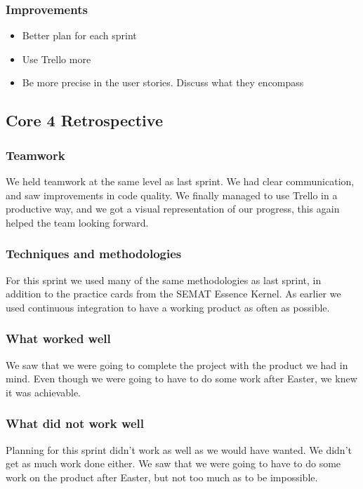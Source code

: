\subsubsection{Improvements}
\begin{itemize}
    \item Better plan for each sprint
    \item Use Trello more
    \item Be more precise in the user stories. Discuss what they encompass 
\end{itemize}

\subsection{Core 4 Retrospective}
\subsubsection{Teamwork}
We held teamwork at the same level as last sprint. We had clear communication, and saw improvements in code quality. We finally managed to use Trello in a productive way, and we got a visual representation of our progress, this again helped the team looking forward.

\subsubsection{Techniques and methodologies}
For this sprint we used many of the same methodologies as last sprint, in addition to the practice cards from the SEMAT Essence Kernel. As earlier we used continuous integration to have a working product as often as possible.

\subsubsection{What worked well}
We saw that we were going to complete the project with the product we had in mind. Even though we were going to have to do some work after Easter, we knew it was achievable.

\subsubsection{What did not work well}
Planning for this sprint didn't work as well as we would have wanted. We didn't get as much work done either. We saw that we were going to have to do some work on the product after Easter, but not too much as to be impossible.

